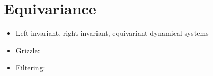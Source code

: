 
\chapter{Equivariance}


\begin{itemize}
  \item Left-invariant, right-invariant, equivariant dynamical systems
\end{itemize}

\begin{itemize}
  \item Grizzle: \cite{grizzle_structure_1985}
  \item Filtering: \cite{van_goor_equivariant_2020}
\end{itemize}

